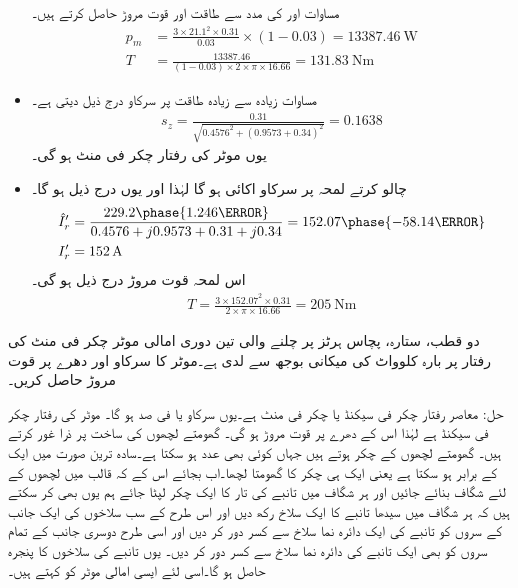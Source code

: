 \begin{itemize}
مساوات   اور   کی مدد سے طاقت اور قوت مروڑ حاصل کرتے ہیں۔
\begin{align*}
p_m&=\frac{3\times 21.1^2\times 0.31}{0.03} \times (1-0.03)=\SI{13387.46}{\watt}\\
T&=\frac{13387.46}{(1-0.03) \times 2\times \pi \times 16.66}=\SI{131.83}{\newton \meter}
\end{align*}
%
\item
مساوات  زیادہ سے زیادہ طاقت پر سرکاو درج ذیل دیتی ہے۔
\begin{align*}
s_z=\frac{0.31}{\sqrt{0.4576^2+(0.9573+0.34)^2}}=0.1638
\end{align*}
یوں موٹر کی رفتار  چکر فی منٹ  ہو گی۔
\item
چالو کرتے لمحہ پر سرکاو اکائی ہو گا لہٰذا  اور یوں درج ذیل ہو گا۔
\begin{align*}
\hat{I}_r'&=\frac{229.2 \phase{1.246\degree}}{0.4576+j 0.9573+0.31+j 0.34}=152.07\phase{-58.14\degree}\\
I_r'&=\SI{152}{\ampere}
\end{align*}
اس لمحہ قوت مروڑ درج ذیل ہو گی۔
\begin{align*}
T=\frac{3 \times 152.07^2 \times 0.31}{2 \times \pi \times 16.66}=\SI{205}{\newton \meter}
\end{align*}
\end{itemize}
%
دو قطب، ستارہ،  پچاس ہرٹز پر چلنے والی تین دوری امالی موٹر   چکر فی منٹ کی رفتار پر بارہ کلوواٹ کی میکانی بوجھ سے لدی ہے۔موٹر کا سرکاو اور دھرے پر قوت مروڑ  حاصل کریں۔

حل:\quad
معاصر رفتار  چکر فی سیکنڈ یا  چکر فی منٹ ہے۔یوں سرکاو   یا  فی صد ہو گا۔ موٹر کی رفتار   چکر فی سیکنڈ ہے لہٰذا اس کے  دھرے پر قوت مروڑ   ہو گی۔
%
گھومتے لچھوں کی ساخت پر ذرا غور کرتے ہیں۔ گھومتے لچھوں کے   چکر ہوتے ہیں جہاں  کوئی بھی عدد ہو سکتا ہے۔سادہ ترین صورت میں   ایک کے برابر ہو سکتا ہے یعنی ایک ہی چکر کا گھومتا لچھا۔اب بجائے اس کے کہ قالب میں لچھوں کے لئے شگاف بنائے جائیں اور ہر شگاف میں تانبے کی تار کا ایک چکر لپٹا جائے ہم یوں بھی کر سکتے ہیں کہ ہر شگاف میں سیدھا تانبے کا ایک سلاخ رکھ دیں اور اس طرح کے سب سلاخوں کی ایک جانب کے سروں کو تانبے کی ایک دائرہ نما سلاخ سے کسر دور کر دیں اور اسی طرح دوسری جانب کے تمام سروں کو بھی ایک تانبے کی دائرہ نما سلاخ سے کسر  دور کر دیں۔ یوں تانبے کی سلاخوں کا پنجرہ حاصل ہو گا۔اسی لئے ایسی امالی موٹر کو  کہتے ہیں۔

